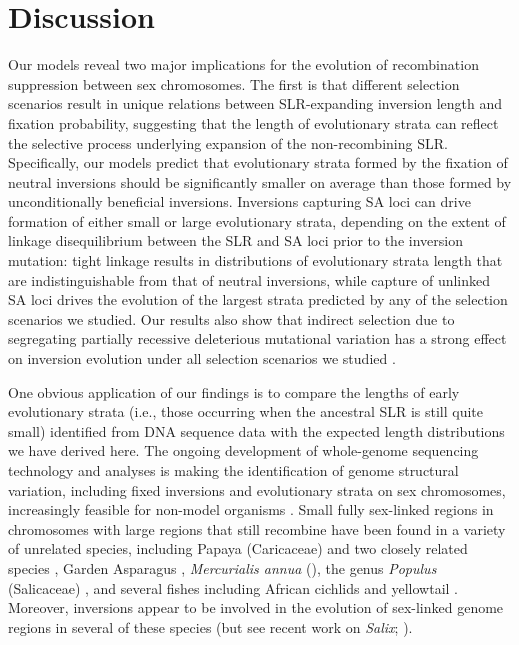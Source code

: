\documentclass{article}[12pt]
\begin{document}



\section*{Discussion} \label{sec:Discussion}


Our models reveal two major implications for the evolution of recombination suppression between sex chromosomes. The first is that different selection scenarios result in unique relations between SLR-expanding inversion length and fixation probability, suggesting that the length of evolutionary strata can reflect the selective process underlying expansion of the non-recombining SLR. Specifically, our models predict that evolutionary strata formed by the fixation of neutral inversions should be significantly smaller on average than those formed by unconditionally beneficial inversions. Inversions capturing SA loci can drive formation of either small or large evolutionary strata, depending on the extent of linkage disequilibrium between the SLR and SA loci prior to the inversion mutation: tight linkage results in distributions of evolutionary strata length that are indistinguishable from that of neutral inversions, while capture of unlinked SA loci drives the evolution of the largest strata predicted by any of the selection scenarios we studied. Our results also show that indirect selection due to segregating partially recessive deleterious mutational variation has a strong effect on inversion evolution under all selection scenarios we studied \citep{Olito-etal-2022}.

One obvious application of our findings is to compare the lengths of early evolutionary strata (i.e., those occurring when the ancestral SLR is still quite small) identified from DNA sequence data with the expected length distributions we have derived here. The ongoing development of whole-genome sequencing technology and analyses is making the identification of genome structural variation, including fixed inversions and evolutionary strata on sex chromosomes, increasingly feasible for non-model organisms \citep[reviewed in ][]{Muyle2017, Charlesworth2018,PandayAzad2016}. Small fully sex-linked regions in chromosomes with large regions that still recombine have been found in a variety of unrelated species, including Papaya (Caricaceae) and two closely related species \citep{Wang2012, Lovene2015}, Garden Asparagus \citep{Harkess2017}, {\itshape Mercurialis annua} (\citealt{VeltsosPannell2019}), the genus {\itshape Populus}  (Salicaceae) \citep[reviewed in][]{HobzaEtAl2018}, and several fishes including African cichlids \citep{GammerdingerKocher2018} and yellowtail \citep{KoyamaEtAl2015}. Moreover, inversions appear to be involved in the evolution of sex-linked genome regions in several of these species (but see recent work on {\itshape Salix}; \citealt{AlmeidaMank2020}). 
\end{document}
